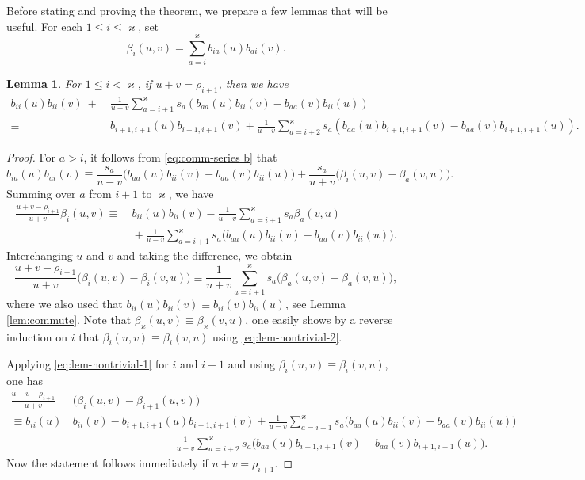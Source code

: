 \documentclass[11pt,reqno]{amsart}
\numberwithin{equation}{section}
\newtheorem{lem}[thm]{Lemma}
\theoremstyle{definition}
\theoremstyle{remark}
\newcommand{\beq}{\begin{equation}}
\newcommand{\eeq}{\end{equation}}
\newcommand{\lle}{\leqslant}
\newcommand{\ka}{\varkappa}
\begin{document}
Before stating and proving the theorem, we prepare a few lemmas that will be useful. For each $1\lle i\lle \ka$, set
\beq\label{eq:beta}
\beta_i(u,v)=\sum_{a=i}^\ka b_{ia}(u)b_{ai}(v).
\eeq
\begin{lem}
For $1\lle i<\ka$, if $u+v=\rho_{i+1}$, then we have
\begin{align*}
b_{ii}(u)b_{ii}(v)\ +&\ \frac{1}{u-v}\sum_{a=i+1}^\ka s_a(b_{aa}(u)b_{ii}(v)-b_{aa}(v)b_{ii}(u))\\
\equiv &\
b_{i+1,i+1}(u)b_{i+1,i+1}(v)+\frac{1}{u-v}\sum_{a=i+2}^\ka s_a(b_{aa}(u)b_{i+1,i+1}(v)-b_{aa}(v)b_{i+1,i+1}(u)).
\end{align*}
\end{lem}
\begin{proof}
For $a>i$, it follows from \eqref{eq:comm-series b} that
\[
b_{ia}(u)b_{ai}(v)\equiv \frac{s_a}{u-v}\big(b_{aa}(u)b_{ii}(v)-b_{aa}(v)b_{ii}(u)\big)+\frac{s_a}{u+v}\big(\beta_i(u,v)-\beta_a(v,u)\big).
\]
Summing over $a$ from $i+1$ to $\ka$, we have
\beq\label{eq:lem-nontrivial-1}
\begin{split}
    \frac{u+v-\rho_{i+1}}{u+v}\beta_i(u,v)\equiv &\ b_{ii}(u)b_{ii}(v)-\frac{1}{u+v}\sum_{a=i+1}^\ka s_a\beta_a(v,u)\\
    & \ +\frac{1}{u-v}\sum_{a=i+1}^\ka s_a\big(b_{aa}(u)b_{ii}(v)-b_{aa}(v)b_{ii}(u)\big).
\end{split}
\eeq
Interchanging $u$ and $v$ and taking the difference, we obtain
\beq\label{eq:lem-nontrivial-2}
\frac{u+v-\rho_{i+1}}{u+v}\big(\beta_i(u,v)-\beta_i(v,u)\big)\equiv \frac{1}{u+v}\sum_{a=i+1}^\ka s_a\big(\beta_a(u,v)-\beta_a(v,u)\big),
\eeq
where we also used that $b_{ii}(u)b_{ii}(v)\equiv b_{ii}(v)b_{ii}(u)$, see Lemma \ref{lem:commute}. Note that $\beta_\ka(u,v)\equiv \beta_\ka(v,u)$, one easily shows by a reverse induction on $i$ that $\beta_i(u,v)\equiv \beta_i(v,u)$ using \eqref{eq:lem-nontrivial-2}.

Applying \eqref{eq:lem-nontrivial-1} for $i$ and $i+1$ and using $\beta_i(u,v)\equiv \beta_i(v,u)$, one has
\beq\label{eq:lem-nontrivial-3}
\begin{split}
    \frac{u+v-\rho_{i+1}}{u+v}&\, \big(\beta_i(u,v)-\beta_{i+1}(u,v)\big)\\
    \equiv   b_{ii}(u)&\, b_{ii}(v) -b_{i+1,i+1}(u)b_{i+1,i+1}(v)+\frac{1}{u-v}\sum_{a=i+1}^\ka s_a\big(b_{aa}(u)b_{ii}(v)-b_{aa}(v)b_{ii}(u)\big)\\
    &\ \qquad\qquad \qquad \qquad  -\frac{1}{u-v}\sum_{a=i+2}^\ka s_a\big(b_{aa}(u)b_{i+1,i+1}(v)-b_{aa}(v)b_{i+1,i+1}(u)\big).
\end{split}
\eeq
Now the statement follows immediately if $u+v=\rho_{i+1}$.
\end{proof}
\end{document}
